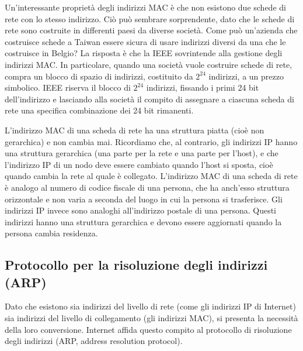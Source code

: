 Un’interessante proprietà degli indirizzi MAC è che non esistono due schede di rete con lo stesso indirizzo. Ciò può sembrare sorprendente, dato che le schede di rete sono costruite in differenti paesi da diverse società. Come può un’azienda che costruisce schede a Taiwan essere sicura di usare indirizzi diversi da una che le costruisce in Belgio? La risposta è che la IEEE sovrintende alla gestione degli indirizzi MAC. In particolare, quando una società vuole costruire schede di rete, compra un blocco di spazio di indirizzi, costituito da $2^{24}$ indirizzi, a un prezzo simbolico. IEEE riserva il blocco di $2^{24}$ indirizzi, fissando i primi 24 bit dell’indirizzo e lasciando alla società il compito di assegnare a ciascuna scheda di rete una specifica combinazione dei 24 bit rimanenti.

L’indirizzo MAC di una scheda di rete ha una struttura piatta (cioè non gerarchica)
e non cambia mai. Ricordiamo che, al contrario, gli indirizzi IP hanno una struttura gerarchica (una parte per la rete e una parte per l’host), e che l’indirizzo IP di un nodo deve essere cambiato quando l’host si sposta, cioè quando cambia la rete al quale è collegato. L’indirizzo MAC di una scheda di rete è analogo al numero di codice fiscale di una persona, che ha anch’esso struttura orizzontale e non varia a seconda del luogo in cui la persona si trasferisce. Gli indirizzi IP invece sono analoghi all’indirizzo postale di una persona. Questi indirizzi hanno una struttura gerarchica e devono essere aggiornati quando la persona cambia residenza.

\subsection{Protocollo per la risoluzione degli indirizzi (ARP)}
Dato che esistono sia indirizzi del livello di rete (come gli indirizzi IP di Internet) sia indirizzi del livello di collegamento (gli indirizzi MAC), si presenta la necessità della loro conversione. Internet affida questo compito al protocollo di risoluzione degli
indirizzi (ARP, address resolution protocol). 

